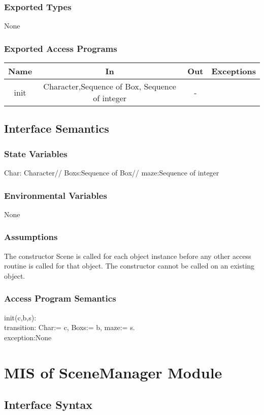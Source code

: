 \documentclass[12pt, titlepage]{article}
\begin{document}
\subsubsection{Exported Types}
None
\subsubsection{Exported Access Programs}
\begin{tabular}[pos]{|c|c|c|c|}
\hline
\textbf{Name}& \textbf{In} & \textbf{Out} & \textbf{Exceptions} \\ \hline
 init&Character,Sequence of Box, Sequence of integer  &-  & \\ \hline

\end{tabular}

\subsection{Interface Semantics}
\subsubsection{State Variables}
Char: Character//
Boxs:Sequence of Box//
maze:Sequence of integer
\subsubsection{Environmental Variables}
None
\subsubsection{Assumptions}
The constructor Scene is called for each object instance before any other
access routine is called for that object.  The constructor cannot be called on
an existing object.
\subsubsection{Access Program Semantics}
init(c,b,s):\\
transition: Char:= c, Boxs:= b, maze:= s.\\
exception:None

\section{MIS of SceneManager Module}
\subsection{Interface Syntax}
\end{document}
